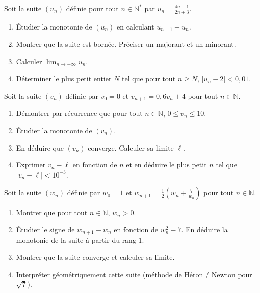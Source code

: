 \documentclass[11pt]{article}
\newcounter{popsec}
\newcounter{popsub}
\newcommand{\courssub}[1]{%
  \stepcounter{popsub}%
  \par\vspace{9pt}\noindent{\popxbold\fontsize{11.5}{13}\selectfont\color{popink}{\color{poporange}\thepopsec.\thepopsub}\hspace{6pt}#1}\par\nopagebreak\vspace{4pt}
}
\begin{document}
\courssub{Je m'entraîne}

\begin{exercice}
Soit la suite $(u_n)$ définie pour tout $n \in \mathbb{N}^*$ par $u_n = \frac{4n - 1}{2n + 3}$.
\begin{enumerate}
    \item Étudier la monotonie de $(u_n)$ en calculant $u_{n+1} - u_n$.
    \item Montrer que la suite est bornée. Préciser un majorant et un minorant.
    \item Calculer $\lim_{n\to +\infty} u_n$.
    \item Déterminer le plus petit entier $N$ tel que pour tout $n \ge N$, $|u_n - 2| < 0,01$.
\end{enumerate}
\end{exercice}

\begin{exercice}
Soit la suite $(v_n)$ définie par $v_0 = 0$ et $v_{n+1} = 0,6 v_n + 4$ pour tout $n \in \mathbb{N}$.
\begin{enumerate}
    \item Démontrer par récurrence que pour tout $n \in \mathbb{N}$, $0 \le v_n \le 10$.
    \item Étudier la monotonie de $(v_n)$.
    \item En déduire que $(v_n)$ converge. Calculer sa limite $\ell$.
    \item Exprimer $v_n - \ell$ en fonction de $n$ et en déduire le plus petit $n$ tel que $|v_n - \ell| < 10^{-3}$.
\end{enumerate}
\end{exercice}

\begin{exercice}
Soit la suite $(w_n)$ définie par $w_0 = 1$ et $w_{n+1} = \frac{1}{2}\left(w_n + \frac{7}{w_n}\right)$ pour tout $n \in \mathbb{N}$.
\begin{enumerate}
    \item Montrer que pour tout $n \in \mathbb{N}$, $w_n > 0$.
    \item Étudier le signe de $w_{n+1} - w_n$ en fonction de $w_n^2 - 7$. En déduire la monotonie de la suite à partir du rang 1.
    \item Montrer que la suite converge et calculer sa limite.
    \item Interpréter géométriquement cette suite (méthode de Héron / Newton pour $\sqrt{7}$).
\end{enumerate}
\end{exercice}
\end{document}
